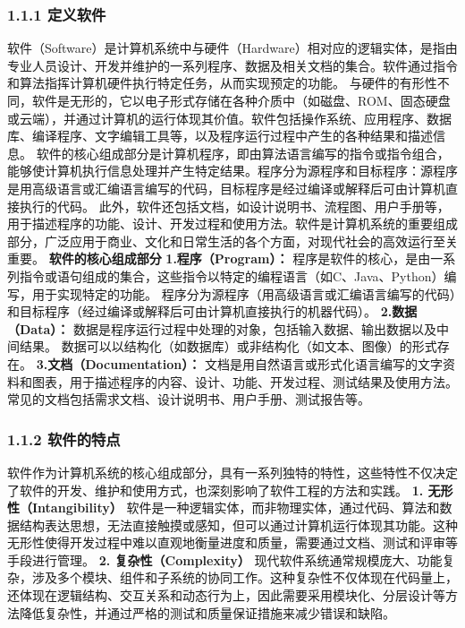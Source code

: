 \subsubsection{1.1.1 定义软件}\label{ux5b9aux4e49ux8f6fux4ef6}
软件（Software）是计算机系统中与硬件（Hardware）相对应的逻辑实体，是指由专业人员设计、开发并维护的一系列程序、数据及相关文档的集合。软件通过指令和算法指挥计算机硬件执行特定任务，从而实现预定的功能。
与硬件的有形性不同，软件是无形的，它以电子形式存储在各种介质中（如磁盘、ROM、固态硬盘或云端），并通过计算机的运行体现其价值。软件包括操作系统、应用程序、数据库、编译程序、文字编辑工具等，以及程序运行过程中产生的各种结果和描述信息。
软件的核心组成部分是计算机程序，即由算法语言编写的指令或指令组合，能够使计算机执行信息处理并产生特定结果。程序分为源程序和目标程序：源程序是用高级语言或汇编语言编写的代码，目标程序是经过编译或解释后可由计算机直接执行的代码。
此外，软件还包括文档，如设计说明书、流程图、用户手册等，用于描述程序的功能、设计、开发过程和使用方法。软件是计算机系统的重要组成部分，广泛应用于商业、文化和日常生活的各个方面，对现代社会的高效运行至关重要。
\textbf{软件的核心组成部分} \textbf{1.程序（Program）：} 程序是软件的核心，是由一系列指令或语句组成的集合，这些指令以特定的编程语言（如C、Java、Python）编写，用于实现特定的功能。
程序分为源程序（用高级语言或汇编语言编写的代码）和目标程序（经过编译或解释后可由计算机直接执行的机器代码）。 \textbf{2.数据（Data）：} 数据是程序运行过程中处理的对象，包括输入数据、输出数据以及中间结果。
数据可以以结构化（如数据库）或非结构化（如文本、图像）的形式存在。 \textbf{3.文档（Documentation）：} 文档是用自然语言或形式化语言编写的文字资料和图表，用于描述程序的内容、设计、功能、开发过程、测试结果及使用方法。
常见的文档包括需求文档、设计说明书、用户手册、测试报告等。 \subsubsection{1.1.2 软件的特点}\label{ux8f6fux4ef6ux7684ux7279ux70b9}
软件作为计算机系统的核心组成部分，具有一系列独特的特性，这些特性不仅决定了软件的开发、维护和使用方式，也深刻影响了软件工程的方法和实践。 \textbf{1. 无形性（Intangibility）}
软件是一种逻辑实体，而非物理实体，通过代码、算法和数据结构表达思想，无法直接触摸或感知，但可以通过计算机运行体现其功能。这种无形性使得开发过程中难以直观地衡量进度和质量，需要通过文档、测试和评审等手段进行管理。 \textbf{2.
复杂性（Complexity）}
现代软件系统通常规模庞大、功能复杂，涉及多个模块、组件和子系统的协同工作。这种复杂性不仅体现在代码量上，还体现在逻辑结构、交互关系和动态行为上，因此需要采用模块化、分层设计等方法降低复杂性，并通过严格的测试和质量保证措施来减少错误和缺陷。
